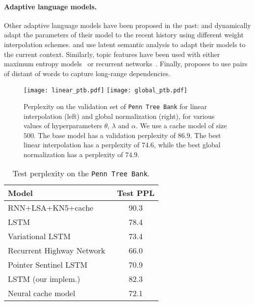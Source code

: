 \documentclass{article} \usepackage{iclr2017_conference,times}
\begin{document}
\paragraph{Adaptive language models.} Other adaptive language models have been
proposed in the past: \citet{kneser1993dynamic} and \citet{iyer1999modeling}
dynamically adapt the parameters of their model to the recent history using
different weight interpolation schemes.  \citet{bellegarda2000exploiting} and
\citet{coccaro1998towards} use latent semantic analysis to adapt their models
to the current context.  Similarly, topic features have been used with either
maximum entropy models~\citep{khudanpur2000maximum} or recurrent
networks~\citep{mikolov2012context,wang2015larger}.  Finally,
  \citet{lau1993trigger} proposes to use pairs of distant of words to capture
  long-range dependencies.

\begin{figure}
  \centering
  \texttt{[image: linear\_ptb.pdf]}
  \texttt{[image: global\_ptb.pdf]}

  \vspace{-0.5cm}
  \caption{Perplexity on the validation set of \texttt{Penn Tree Bank} for linear interpolation (left) and global normalization (right), for various values of hyperparameters $\theta$, $\lambda$ and $\alpha$.
    We use a cache model of size $500$. The base model has a validation perplexity of $86.9$.
    The best linear interpolation has a perplexity of $74.6$, while the best global normalization has a perplexity of $74.9$.}
  \label{fig:ptb}
\end{figure}

\begin{table}
  \small
  \centering
  \begin{tabular}{lc}
    \toprule
    Model & Test PPL \\
    \midrule
    RNN+LSA+KN5+cache~\citep{mikolov2012context}         & 90.3 \\
    LSTM~\citep{zaremba2014recurrent}                    & 78.4 \\
    Variational LSTM~\citep{gal2015theoretically}        & 73.4 \\
    Recurrent Highway Network~\citep{zilly2016recurrent} & 66.0 \\ Pointer Sentinel LSTM~\citep{merity2016pointer}      & 70.9 \\
    \midrule
    LSTM (our implem.)                                   & 82.3 \\
    Neural cache model                                   & 72.1 \\
    \bottomrule
  \end{tabular}
  \caption{Test perplexity on the \texttt{Penn Tree Bank}.}
  \label{tab:ptb}
\end{table}
\end{document}
